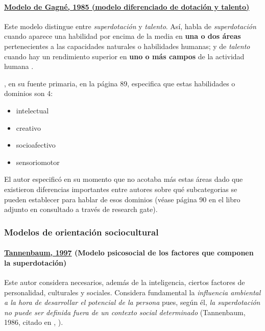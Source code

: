 \documentclass[12pt, a4paper]{article}
\begin{document}
	\newpage
	\paragraph{\underline{Modelo de Gagné, 1985 (modelo diferenciado de dotación y talento)}}
	
	Este modelo distingue entre \textit{superdotación} y \textit{talento}. Así, habla de \textit{superdotación} cuando aparece una habilidad por encima de la media en \textbf{una o dos áreas} pertenecientes a las capacidades naturales o habilidades humanas; y de \textit{talento} cuando hay un rendimiento superior en\textbf{ uno o más campos} de la actividad humana \textcite{reche2019models}.
	
	
	\textcite{gagneModelBasatEnRendiment}, en su fuente primaria, en la página 89, especifica que estas habilidades o dominios son 4:
	
	
	\begin{itemize}[noitemsep]
		\item intelectual
		\item creativo
		\item socioafectivo
		\item sensoriomotor
	\end{itemize}
	
	El autor especificó en su momento que no acotaba más estas áreas dado que existieron diferencias importantes entre autores sobre qué subcategorias se pueden establecer para hablar de esos dominios (véase página 90 en el libro adjunto en \textcite{gagneModelBasatEnRendiment} consultado a través de research gate).
	
	
	

	
	
	
	
	
	\subsubsection{Modelos de orientación sociocultural}
	
	\paragraph{\underline{Tannenbaum, 1997} (Modelo psicosocial de los factores que componen la superdotación)}
	\label{par:tannenbaum}
	
	Este autor considera necesarios, además de la inteligencia, ciertos factores de personalidad, culturales y sociales. Considera fundamental la \textit{influencia ambiental a la hora de desarrollar el potencial de la persona} \parencite{reche2019models} pues, según él, \textit{la superdotación no puede ser definida
	fuera de un contexto social determinado} (Tannenbaum, 1986, citado en \citeauthor{Arocas2002OrientPsicopedGVA}, \citeyear{Arocas2002OrientPsicopedGVA}).
	
\end{document}
